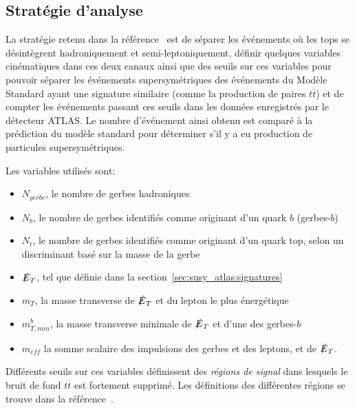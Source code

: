 \subsection{Stratégie d'analyse}
\label{sec:susy_atlas:gtt:strategie}

La stratégie retenu dans la référence~\cite{ATLAS-CONF-2015-067} est
de séparer les événements où les tops se désintègrent hadroniquement et
semi-leptoniquement, définir quelques variables cinématiques dans ces
deux canaux ainsi que des seuils sur ces variables pour pouvoir
séparer les événements supersymétriques des événements du Modèle
Standard ayant une signature similaire (comme la production de paires
$t\overline{t}$) et de compter les événements passant ces seuils dans
les données enregistrés par le détecteur ATLAS. Le nombre d'événement
ainsi obtenu est comparé à la prédiction du modèle
standard pour déterminer s'il y a eu production de particules supersymétriques.

\noindent Les variables utilisés sont:

\begin{itemize}
\item $N_{gerbe}$, le nombre de gerbes hadroniques %
\item $N_b$, le nombre de gerbes identifiés comme originant d'un quark $b$ (gerbes-$b$)
\item $N_{t}$, le nombre de gerbes identifiés comme originant d'un
  quark top, selon un discriminant basé sur la masse de la gerbe
\item $\slashed{E}_T$, tel que définie dans la
  section~\ref{sec:susy_atlas:signatures}
\item $m_T$, la masse transverse de $\slashed{E}_T$ et du lepton le
  plus énergétique
\item $m_{T,min}^b$, la masse transverse minimale de $\slashed{E}_T$ et
  d'une des gerbes-$b$
\item $m_{eff}$ la somme scalaire des impulsions des gerbes et des leptons, et de $\slashed{E}_T$.
\end{itemize}

Différents seuils sur ces variables définissent des \emph{régions de
  signal} dans lesquels le bruit de fond $t\overline{t}$ est fortement
supprimé. Les définitions des différentes régions se trouve dans la
référence~\cite{ATLAS-CONF-2015-067}.


